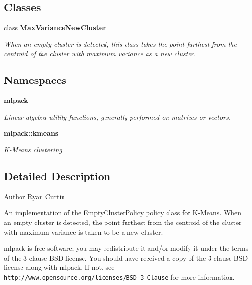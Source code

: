 \subsection*{Classes}
\begin{DoxyCompactItemize}
\item 
class \textbf{ Max\+Variance\+New\+Cluster}
\begin{DoxyCompactList}\small\item\em When an empty cluster is detected, this class takes the point furthest from the centroid of the cluster with maximum variance as a new cluster. \end{DoxyCompactList}\end{DoxyCompactItemize}
\subsection*{Namespaces}
\begin{DoxyCompactItemize}
\item 
 \textbf{ mlpack}
\begin{DoxyCompactList}\small\item\em Linear algebra utility functions, generally performed on matrices or vectors. \end{DoxyCompactList}\item 
 \textbf{ mlpack\+::kmeans}
\begin{DoxyCompactList}\small\item\em K-\/\+Means clustering. \end{DoxyCompactList}\end{DoxyCompactItemize}


\subsection{Detailed Description}
\begin{DoxyAuthor}{Author}
Ryan Curtin
\end{DoxyAuthor}
An implementation of the Empty\+Cluster\+Policy policy class for K-\/\+Means. When an empty cluster is detected, the point furthest from the centroid of the cluster with maximum variance is taken to be a new cluster.

mlpack is free software; you may redistribute it and/or modify it under the terms of the 3-\/clause B\+SD license. You should have received a copy of the 3-\/clause B\+SD license along with mlpack. If not, see {\tt http\+://www.\+opensource.\+org/licenses/\+B\+S\+D-\/3-\/\+Clause} for more information. 